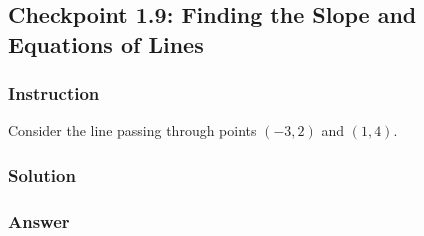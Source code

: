 \subsection*{Checkpoint 1.9: Finding the Slope and Equations of Lines}

\subsubsection*{Instruction}

Consider the line passing through points  $ (-3,2) $ and  $ (1,4) $.

\subsubsection*{Solution}

\subsubsection{Answer}
